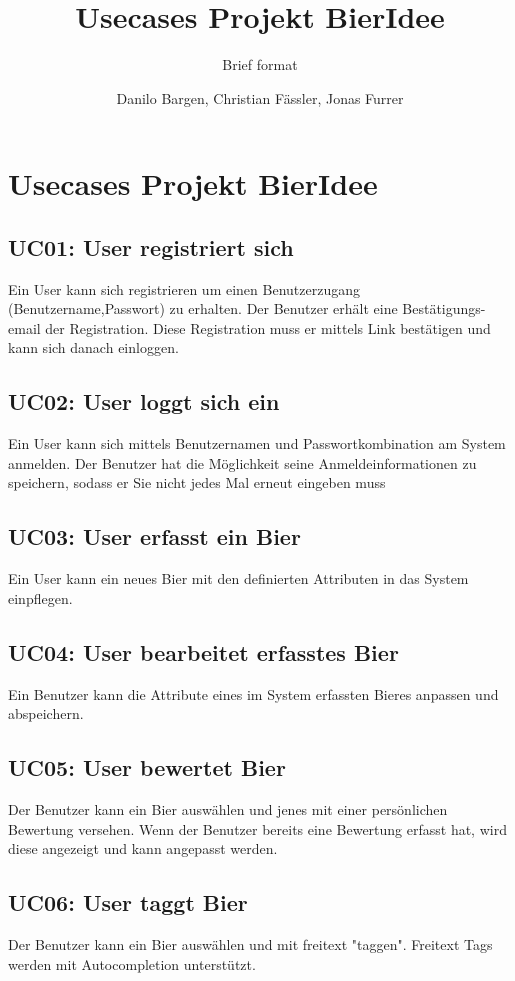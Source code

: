 \documentclass[10pt,a4paper]{scrartcl}
\author{Danilo Bargen, Christian Fässler, Jonas Furrer}
\title{Usecases Projekt BierIdee}
\subtitle{Brief format}
\begin{document}
\begin{titlepage}
	\maketitle
	\vspace{120mm}
	\thispagestyle{empty} %
\end{titlepage}



\section{Usecases Projekt BierIdee}

\subsection*{UC01: User registriert sich}
Ein User kann sich registrieren um einen Benutzerzugang (Benutzername,Passwort) zu erhalten. Der Benutzer erhält eine Bestätigungs-email der Registration.
Diese Registration muss er mittels Link bestätigen und kann sich danach einloggen.
\subsection*{UC02: User loggt sich ein}
Ein User kann sich mittels Benutzernamen und Passwortkombination am System anmelden.
Der Benutzer hat die Möglichkeit seine Anmeldeinformationen zu speichern, sodass er Sie nicht jedes Mal erneut eingeben muss
\subsection*{UC03: User erfasst ein Bier}
Ein User kann ein neues Bier mit den definierten Attributen in das System einpflegen.
\subsection*{UC04: User bearbeitet erfasstes Bier}
Ein Benutzer kann die Attribute eines im System erfassten Bieres anpassen und abspeichern.
\subsection*{UC05: User bewertet Bier}
Der Benutzer kann ein Bier auswählen und jenes mit einer persönlichen Bewertung versehen. Wenn der Benutzer bereits eine Bewertung erfasst hat, wird diese angezeigt und kann angepasst werden.
\subsection*{UC06: User taggt Bier}
Der Benutzer kann ein Bier auswählen und mit freitext "taggen". Freitext Tags werden mit Autocompletion unterstützt.
\end{document}

